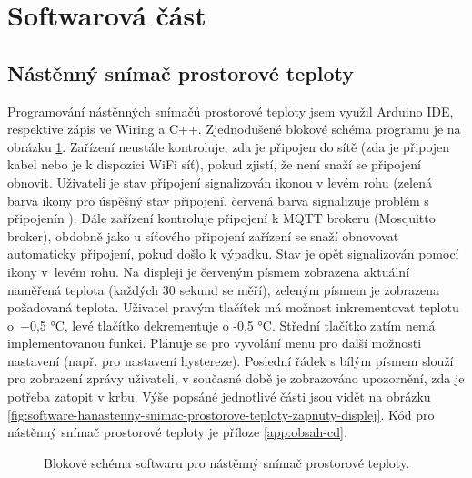 \section{Softwarová část}

\subsection{Nástěnný snímač prostorové teploty}
Programování nástěnných snímačů prostorové teploty jsem využil Arduino IDE, respektive zápis ve Wiring a C++. Zjednodušené blokové schéma programu je na obrázku \ref{fig:blokove-schema-nastenny-snimac-prostorove-teploty-ethernet}. Zařízení neustále kontroluje, zda je připojen do sítě (zda je připojen kabel nebo je k dispozici WiFi síť), pokud zjistí, že není snaží se připojení obnovit. Uživateli je stav připojení signalizován ikonou v levém rohu (zelená barva ikony pro úspěšný stav připojení, červená barva signalizuje problém s připojenín ). Dále zařízení kontroluje připojení k MQTT brokeru (Mosquitto broker), obdobně jako u síťového připojení zařízení se snaží obnovovat automaticky připojení, pokud došlo k výpadku. Stav je opět signalizován pomocí ikony v~levém rohu. Na displeji je červeným písmem zobrazena aktuální naměřená teplota (každých 30 sekund se měří), zeleným písmem je zobrazena požadovaná teplota. Uživatel pravým tlačítek má možnost inkrementovat teplotu o~+0,5 °C, levé tlačítko dekrementuje o -0,5 °C. Střední tlačítko zatím nemá implementovanou funkci. Plánuje se pro vyvolání menu pro další možnosti nastavení (např. pro nastavení hystereze). Poslední řádek s bílým písmem slouží pro zobrazení zprávy uživateli, v současné době je zobrazováno upozornění, zda je potřeba zatopit v krbu. Výše popsáné jednotlivé části jsou vidět na obrázku \ref{fig:software-hanastenny-snimac-prostorove-teploty-zapnuty-displej}. Kód pro nástěnný snímač prostorové teploty je příloze \ref{app:obsah-cd}.

\begin{figure}[H]
    \centering
    \def\svgwidth{\columnwidth}
    
    \caption{Blokové schéma softwaru pro nástěnný snímač prostorové teploty.}
    \label{fig:blokove-schema-nastenny-snimac-prostorove-teploty-ethernet}
\end{figure}

